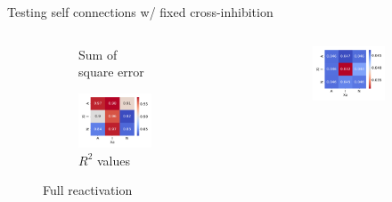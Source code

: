 \documentclass[aspectratio=169,9pt]{beamer}
\begin{document}
\begin{frame}{Testing self connections w/ fixed cross-inhibition}
\begin{columns}
\begin{column}{0.3\textwidth}
\begin{figure}[h]
\begin{subfigure}[b]{\textwidth}
                            \caption{Sum of square error}
                        \end{subfigure}
                        \begin{subfigure}[b]{\textwidth}
                            \centering
                            \includegraphics[width=\textwidth]{vary_self-iPSC_timeshifted-rsq-hmap}
                            \caption{$R^2$ values}
                        \end{subfigure}
                    \caption{Full reactivation}
                \end{figure}
            \end{column}
            \pause
            \begin{column}{0.3\textwidth}
                \begin{figure}[h]
                        \centering
                        \begin{subfigure}[b]{\textwidth}
                            \centering
                            \includegraphics[width=\textwidth]{vary_self-Partial_timeshifted-sse-hmap}

\end{subfigure}
\end{figure}
\end{column}
\end{columns}
\end{frame}
\end{document}

